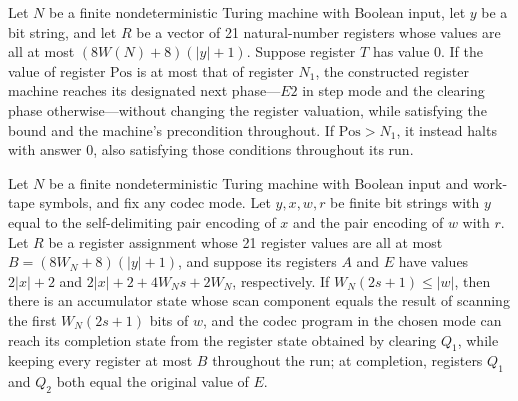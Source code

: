 \begin{theorem}
\label{Complexity.Codec.le_phase}
\leanok
{}
Let $N$ be a finite nondeterministic Turing machine with Boolean input, let $y$ be a bit
string, and let $R$ be a vector of 21 natural-number registers whose values are all at
most $(8W(N)+8)(|y|+1)$. Suppose register $T$ has value $0$. If the value of register
$\mathrm{Pos}$ is at most that of register $N_1$, the constructed register machine
reaches its designated next phase—$E2$ in step mode and the clearing phase
otherwise—without changing the register valuation, while satisfying the bound and the
machine's precondition throughout. If $\mathrm{Pos}>N_1$, it instead halts with answer
$0$, also satisfying those conditions throughout its run.
\end{theorem}

\begin{theorem}
\label{Complexity.Codec.vscan_run}
\leanok
{}
Let $N$ be a finite nondeterministic Turing machine with Boolean input and work-tape
symbols, and fix any codec mode. Let $y,x,w,r$ be finite bit strings with $y$ equal to
the self-delimiting pair encoding of $x$ and the pair encoding of $w$ with $r$. Let $R$
be a register assignment whose 21 register values are all at most $B=(8W_N+8)(|y|+1)$,
and suppose its registers $A$ and $E$ have values $2|x|+2$ and $2|x|+2+4W_Ns+2W_N$,
respectively. If $W_N(2s+1)\le |w|$, then there is an accumulator state whose scan
component equals the result of scanning the first $W_N(2s+1)$ bits of $w$, and the codec
program in the chosen mode can reach its completion state from the register state
obtained by clearing $Q_1$, while keeping every register at most $B$ throughout the run;
at completion, registers $Q_1$ and $Q_2$ both equal the original value of $E$.
\end{theorem}
